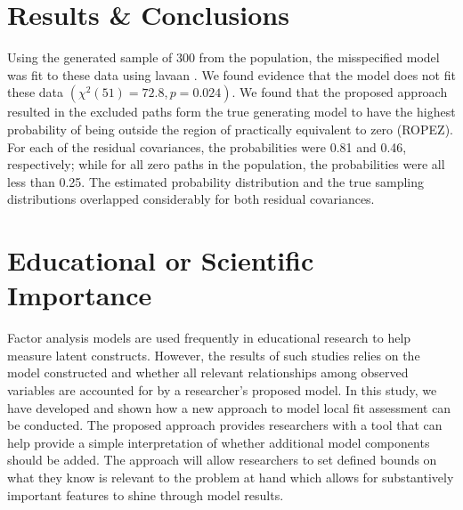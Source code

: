 \documentclass[man, noextraspace, floatsintext, 12pt]{apa7}
\begin{document}
\section*{Results \& Conclusions}
Using the generated sample of 300 from the population, the misspecified model was fit to these data using \textsf{lavaan} \citep{Rosseel2012}.
We found evidence that the model does not fit these data $(\chi^2(51) = 72.8, p = 0.024)$. 
We found that the proposed approach resulted in the excluded paths form the true generating model to have the highest probability of being outside the region of practically equivalent to zero (ROPEZ).
For each of the residual covariances, the probabilities were 0.81 and 0.46, respectively; while for all zero paths in the population, the probabilities were all less than 0.25.
The estimated probability distribution and the true sampling distributions overlapped considerably for both residual covariances.

\section*{Educational or Scientific Importance}

Factor analysis models are used frequently in educational research to help measure latent constructs.
However, the results of such studies relies on the model constructed and whether all relevant relationships among observed variables are accounted for by a researcher's proposed model.
In this study, we have developed and shown how a new approach to model local fit assessment can be conducted.
The proposed approach provides researchers with a tool that can help provide a simple interpretation of whether additional model components should be added.
The approach will allow researchers to set defined bounds on what they know is relevant to the problem at hand which allows for substantively important features to shine through model results.

\newpage
\raggedright
% 
%
\printbibliography
%
\end{document}

